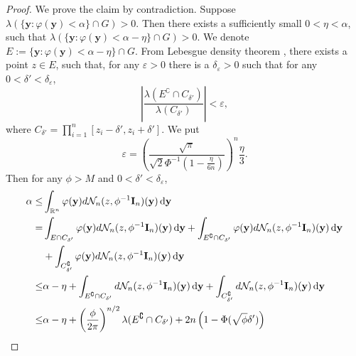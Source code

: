 \documentclass[smallextended]{svjour3}       %
\newcommand{\By}{\mathbf{y}}    \newcommand{\Bz}{\mathbf{z}}
\begin{document}
\begin{proof}
    We prove the claim by contradiction.
    Suppose $\lambda(\{\By:\varphi (\By) <\alpha\} \cap G )>0$.
    Then there exists a sufficiently small $0< \eta <\alpha$, such that $\lambda(\{\By:\varphi (\By) <\alpha-\eta\} \cap G)>0$.
    We denote $ E:=\{\By:\varphi (\By) <\alpha-\eta\} \cap G$.
    From Lebesgue density theorem \citep[Corollary 6.2.6]{book:992991}, there exists a point $z\in  E$, such that, for any $\varepsilon >0$ there is a $\delta_{\varepsilon}>0$ such that for any $0 < \delta' <\delta_\varepsilon$,
    \begin{equation*}
        \left|\frac{\lambda(E^\complement\cap C_{\delta'})}{\lambda(C_{\delta'})}\right|<\varepsilon,
    \end{equation*}
    where $C_{\delta'}=\prod_{i=1}^n [z_i-{\delta'}, z_i + {\delta'}]$.
    We put
    \begin{equation*}
        \varepsilon=\left(\frac{\sqrt \pi}{\sqrt 2 \Phi^{-1}\left(1-\frac{\eta}{6n}\right)}\right)^n \frac{\eta}{3}.
    \end{equation*}
    Then for any $\phi>M$ and $0<\delta' <\delta_\varepsilon$,
    \begin{equation*}
        \begin{split}
            \alpha \leq& 
            \int_{\mathbb R^n}\varphi(\By) d\mathcal N_n (z, \phi^{-1} \BI_n) (\By)\,\mathrm{d} \By
            \\
            =&
            \int_{E\cap C_{\delta'}}\varphi(\By) d\mathcal N_n (z, \phi^{-1} \BI_n) (\By)\,\mathrm{d} \By
            +
            \int_{E^\complement\cap C_{\delta'}}\varphi(\By) d\mathcal N_n (z, \phi^{-1} \BI_n) (\By)\,\mathrm{d} \By
            \\
            &+
            \int_{C_{\delta'}^\complement}\varphi(\By) d\mathcal N_n (z, \phi^{-1} \BI_n) (\By)\,\mathrm{d} \By
            \\
            \leq&
            \alpha-\eta
            +
            \int_{E^\complement\cap C_{\delta'}} d\mathcal N_n (z, \phi^{-1} \BI_n) (\By)\,\mathrm{d} \By
            +
            \int_{C_{\delta'}^\complement} d\mathcal N_n (z, \phi^{-1} \BI_n) (\By)\,\mathrm{d} \By
            \\
            \leq&
            \alpha-\eta
            +
            \left(\frac{\phi}{2\pi}\right)^{n/2}\lambda(E^\complement\cap C_{\delta'})
            +
            2n\left(1-\Phi(\sqrt \phi \delta')\right)

\end{split}
\end{equation*}
\end{proof}
\end{document}
